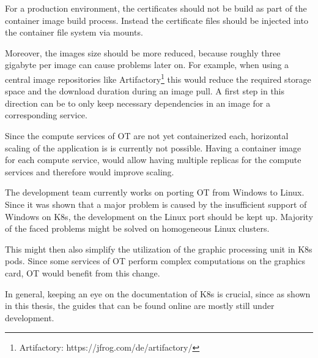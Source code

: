 For a production environment, the certificates should not be build as part of the container image build process. Instead the certificate files should be injected into the container file system via mounts.

Moreover, the images size should be more reduced, because roughly three gigabyte per image can cause problems later on. For example, when using a central image repositories like Artifactory\footnote{Artifactory: https://jfrog.com/de/artifactory/} this would reduce the required storage space and the download duration during an image pull. A first step in this direction can be to only keep necessary dependencies in an image for a corresponding service.

Since the compute services of \ac{OT} are not yet containerized each, horizontal scaling of the application is is currently not possible. Having a container image for each compute service, would allow having multiple replicas for the compute services and therefore would improve scaling.

The development team currently works on porting \ac{OT} from \ac{Windows} to Linux.
Since it was shown that a major problem is caused by the insufficient support of \ac{Windows} on \ac{K8s}, the development on the Linux port should be kept up. Majority of the faced problems might be solved on homogeneous Linux clusters.

This might then also simplify the utilization of the graphic processing unit in \ac{K8s} pods. Since some services of \ac{OT} perform complex computations on the graphics card, \ac{OT} would benefit from this change.

In general, keeping an eye on the documentation of \ac{K8s} is crucial, since as shown in this thesis, the guides that can be found online are mostly still under development.






